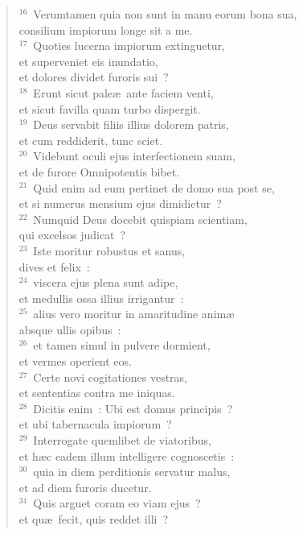 \begin{flushleft}
\begin{verse}
${}^{16}$~Verumtamen quia non sunt in manu eorum bona sua,\\ consilium impiorum longe sit a me.\\
${}^{17}$~Quoties lucerna impiorum extinguetur,\\ et superveniet eis inundatio,\\ et dolores dividet furoris sui~?\\
${}^{18}$~Erunt sicut pale\ae\ ante faciem venti,\\ et sicut favilla quam turbo dispergit.\\
${}^{19}$~Deus servabit filiis illius dolorem patris,\\ et cum reddiderit, tunc sciet.\\
${}^{20}$~Videbunt oculi ejus interfectionem suam,\\ et de furore Omnipotentis bibet.\\
${}^{21}$~Quid enim ad eum pertinet de domo sua post se,\\ et si numerus mensium ejus dimidietur~?\\
${}^{22}$~Numquid Deus docebit quispiam scientiam,\\ qui excelsos judicat~?\\
${}^{23}$~Iste moritur robustus et sanus,\\ dives et felix~:\\
${}^{24}$~viscera ejus plena sunt adipe,\\ et medullis ossa illius irrigantur~:\\
${}^{25}$~alius vero moritur in amaritudine anim\ae \\ absque ullis opibus~:\\
${}^{26}$~et tamen simul in pulvere dormient,\\ et vermes operient eos.\\
${}^{27}$~Certe novi cogitationes vestras,\\ et sententias contra me iniquas.\\
${}^{28}$~Dicitis enim~: Ubi est domus principis~?\\ et ubi tabernacula impiorum~?\\
${}^{29}$~Interrogate quemlibet de viatoribus,\\ et h\ae c eadem illum intelligere cognoscetis~:\\
${}^{30}$~quia in diem perditionis servatur malus,\\ et ad diem furoris ducetur.\\
${}^{31}$~Quis arguet coram eo viam ejus~?\\ et qu\ae\ fecit, quis reddet illi~?\\

\end{verse}
\end{flushleft}
